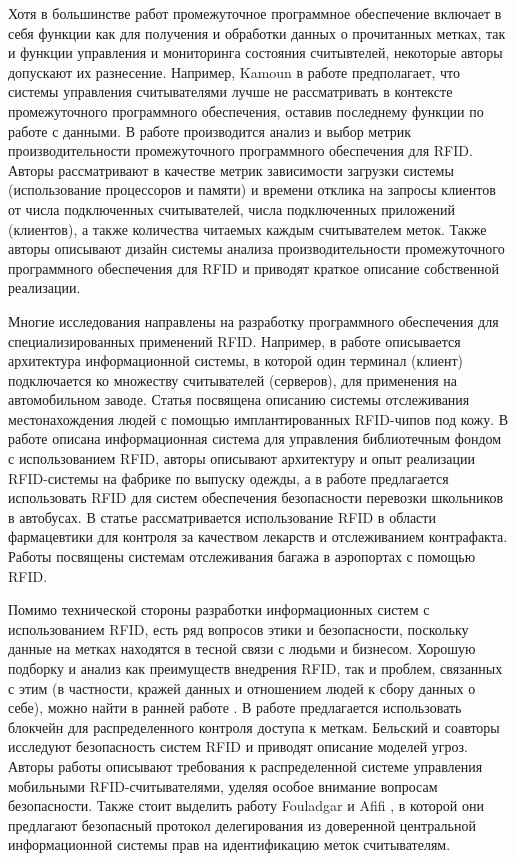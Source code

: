 Хотя в большинстве работ промежуточное программное обеспечение включает в себя функции как для получения и обработки данных о прочитанных метках, так и функции управления и мониторинга состояния считывтелей, некоторые авторы допускают их разнесение. Например, Kamoun в работе \cite{Kamoun2009} предполагает, что системы управления считывателями лучше не рассматривать в контексте промежуточного программного обеспечения, оставив последнему функции по работе с данными. В работе \cite{JongyoungLee2006} производится анализ и выбор метрик производительности промежуточного программного обеспечения для RFID. Авторы рассматривают в качестве метрик зависимости загрузки системы (использование процессоров и памяти) и времени отклика на запросы клиентов от числа подключенных считывателей, числа подключенных приложений (клиентов), а также количества читаемых каждым считывателем меток. Также авторы описывают дизайн системы анализа производительности промежуточного программного обеспечения для RFID и приводят краткое описание собственной реализации.

Многие исследования направлены на разработку программного обеспечения для специализированных применений RFID. Например, в работе \cite{Henao2019} описывается архитектура информационной системы, в которой один терминал (клиент) подключается ко множеству считывателей (серверов), для применения на автомобильном заводе. Статья \cite{Figueroa2019} посвящена описанию системы отслеживания местонахождения людей с помощью имплантированных RFID-чипов под кожу. В работе \cite{Zhang2018} описана информационная система для управления библиотечным фондом с использованием RFID, авторы \cite{Li2010} описывают архитектуру и опыт реализации RFID-системы на фабрике по выпуску одежды, а в работе \cite{Shah2016} предлагается использовать RFID для систем обеспечения безопасности перевозки школьников в автобусах. В статье \cite{Chamekh2017} рассматривается использование RFID в области фармацевтики для контроля за качеством лекарств и отслеживанием контрафакта. Работы \cite{Rouchdi2018,Baskoro2018} посвящены системам отслеживания багажа в аэропортах с помощью RFID.

Помимо технической стороны разработки информационных систем с использованием RFID, есть ряд вопросов этики и безопасности, поскольку данные на метках находятся в тесной связи с людьми и бизнесом. Хорошую подборку и анализ как преимуществ внедрения RFID, так и проблем, связанных с этим (в частности, кражей данных и отношением людей к сбору данных о себе), можно найти в ранней работе \cite{Thompson2007}. В работе \cite{Figueroa2019} предлагается использовать блокчейн для распределенного контроля доступа к меткам. Бельский и соавторы \cite{Belsky2021} исследуют безопасность систем RFID и приводят описание моделей угроз. Авторы работы \cite{Bashir2011} описывают требования к распределенной системе управления мобильными RFID-считывателями, уделяя особое внимание вопросам безопасности. Также стоит выделить работу Fouladgar и Afifi \cite{Fouladgar2007}, в которой они предлагают безопасный протокол делегирования из доверенной центральной информационной системы прав на идентификацию меток считывателям.





